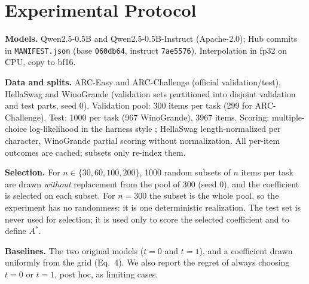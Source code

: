 \documentclass[conference]{IEEEtran}
\begin{document}
\section{Experimental Protocol}
\textbf{Models.} Qwen2.5-0.5B and Qwen2.5-0.5B-Instruct \cite{qwen2024qwen25} (Apache-2.0); Hub commits in \texttt{MANIFEST.json} (base \texttt{060db64}, instruct \texttt{7ae5576}). Interpolation in fp32 on CPU, copy to bf16.

\textbf{Data and splits.} ARC-Easy and ARC-Challenge \cite{clark2018arc} (official validation/test), HellaSwag \cite{zellers2019hellaswag} and WinoGrande \cite{sakaguchi2019winogrande} (validation sets partitioned into disjoint validation and test parts, seed 0). Validation pool: 300 items per task (299 for ARC-Challenge). Test: 1000 per task (967 WinoGrande), 3967 items. Scoring: multiple-choice log-likelihood in the harness style \cite{gao2021lmeval}; HellaSwag length-normalized per character, WinoGrande partial scoring without normalization. All per-item outcomes are cached; subsets only re-index them.

\textbf{Selection.} For $n\in\{30,60,100,200\}$, 1000 random subsets of $n$ items per task are drawn \emph{without} replacement from the pool of 300 (seed 0), and the coefficient is selected on each subset. For $n=300$ the subset is the whole pool, so the experiment has no randomness: it is one deterministic realization. The test set is never used for selection; it is used only to score the selected coefficient and to define $A^\ast$.

\textbf{Baselines.} The two original models ($t=0$ and $t=1$), and a coefficient drawn uniformly from the grid (Eq.~4). We also report the regret of always choosing $t=0$ or $t=1$, post hoc, as limiting cases.
\end{document}
